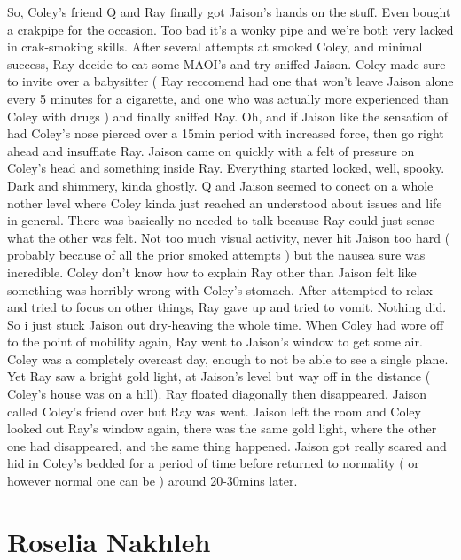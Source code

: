 \documentclass[12pt]{book}
\begin{document}
So, Coley's friend Q and Ray finally got Jaison's hands on the stuff. Even bought a crakpipe for the occasion. Too bad it's a wonky pipe and we're both very lacked in crak-smoking skills. After several attempts at smoked Coley, and minimal success, Ray decide to eat some MAOI's and try sniffed Jaison. Coley made sure to invite over a babysitter ( Ray reccomend had one that won't leave Jaison alone every 5 minutes for a cigarette, and one who was actually more experienced than Coley with drugs ) and finally sniffed Ray. Oh, and if Jaison like the sensation of had Coley's nose pierced over a 15min period with increased force, then go right ahead and insufflate Ray. Jaison came on quickly with a felt of pressure on Coley's head and something inside Ray. Everything started looked, well, spooky. Dark and shimmery, kinda ghostly. Q and Jaison seemed to conect on a whole nother level where Coley kinda just reached an understood about issues and life in general. There was basically no needed to talk because Ray could just sense what the other was felt. Not too much visual activity, never hit Jaison too hard ( probably because of all the prior smoked attempts ) but the nausea sure was incredible. Coley don't know how to explain Ray other than Jaison felt like something was horribly wrong with Coley's stomach. After attempted to relax and tried to focus on other things, Ray gave up and tried to vomit. Nothing did. So i just stuck Jaison out dry-heaving the whole time. When Coley had wore off to the point of mobility again, Ray went to Jaison's window to get some air. Coley was a completely overcast day, enough to not be able to see a single plane. Yet Ray saw a bright gold light, at Jaison's level but way off in the distance ( Coley's house was on a hill). Ray floated diagonally then disappeared. Jaison called Coley's friend over but Ray was went. Jaison left the room and Coley looked out Ray's window again, there was the same gold light, where the other one had disappeared, and the same thing happened. Jaison got really scared and hid in Coley's bedded for a period of time before returned to normality ( or however normal one can be ) around 20-30mins later.



\chapter{Roselia Nakhleh}
\end{document}
